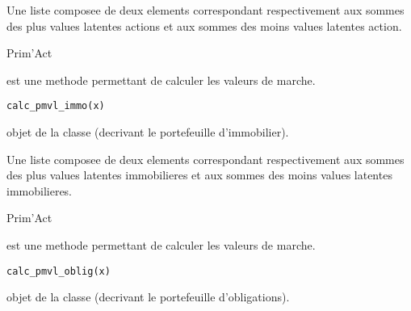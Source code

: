 \documentclass[a4paper]{book}
\begin{document}
%
\begin{Value}
Une liste composee de deux elements  correspondant respectivement 
aux sommes des plus values latentes actions et aux sommes des moins values latentes action.
\end{Value}
%
\begin{Author}\relax
Prim'Act
\end{Author}
%
\begin{Description}\relax
{} est une methode permettant de calculer les valeurs de marche.
\end{Description}
%
\begin{Usage}
\begin{verbatim}
calc_pmvl_immo(x)
\end{verbatim}
\end{Usage}
%
\begin{Arguments}
\begin{ldescription}
\item[\code{x}] objet de la classe  (decrivant le portefeuille d'immobilier).
\end{ldescription}
\end{Arguments}
%
\begin{Value}
Une liste composee de deux elements  correspondant respectivement 
aux sommes des plus values latentes immobilieres et aux sommes des moins values latentes immobilieres.
\end{Value}
%
\begin{Author}\relax
Prim'Act
\end{Author}
%
\begin{Description}\relax
{} est une methode permettant de calculer les valeurs de marche.
\end{Description}
%
\begin{Usage}
\begin{verbatim}
calc_pmvl_oblig(x)
\end{verbatim}
\end{Usage}
%
\begin{Arguments}
\begin{ldescription}
\item[\code{x}] objet de la classe  (decrivant le portefeuille d'obligations).
\end{ldescription}
\end{Arguments}
\end{document}
